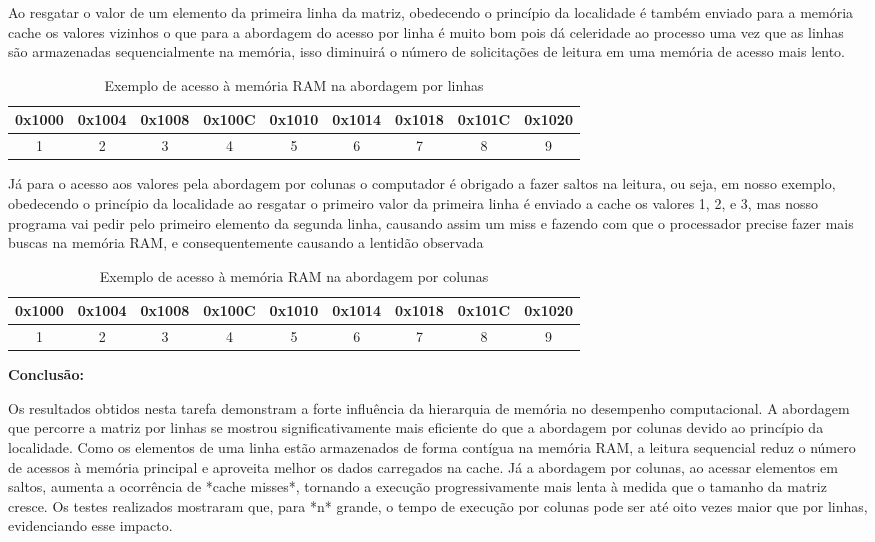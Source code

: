 \documentclass[a4paper, 12pt]{article}
\begin{document}
	Ao resgatar o valor de um elemento da primeira linha da matriz, obedecendo o princípio da localidade é também enviado para a memória cache os valores vizinhos o que para a abordagem do acesso por linha é muito bom pois dá celeridade ao processo uma vez que as linhas são armazenadas sequencialmente na memória, isso diminuirá o número de solicitações de leitura em uma memória de acesso mais lento.
	
	\begin{table}[ht]
	\centering
		\begin{tabular}{|c|c|c|c|c|c|c|c|c|}
			\hline
			0x1000 & 0x1004 & 0x1008 & 0x100C & 0x1010 & 0x1014 & 0x1018 & 0x101C & 0x1020 \\
			\hline
			\cellcolor{cyan}1      & \cellcolor{cyan}2      & \cellcolor{cyan}3      & 4      & 5      & 6      & 7      & 8      & 9      \\
			\hline
		\end{tabular}
		\caption{Exemplo de acesso à memória RAM na abordagem por linhas}
	\end{table}
	
	 Já para o acesso aos valores pela abordagem por colunas o computador é obrigado a fazer saltos na leitura, ou seja, em nosso exemplo, obedecendo o princípio da localidade ao resgatar o primeiro valor da primeira linha é enviado a cache os valores 1, 2, e 3, mas nosso programa vai pedir pelo primeiro elemento da segunda linha, causando assim um miss e fazendo com que o processador precise fazer mais buscas na memória RAM, e consequentemente causando a lentidão observada
	
	\begin{table}[ht]
	\centering
		\begin{tabular}{|c|c|c|c|c|c|c|c|c|}
			\hline
			0x1000 & 0x1004 & 0x1008 & 0x100C & 0x1010 & 0x1014 & 0x1018 & 0x101C & 0x1020 \\
			\hline
			\cellcolor{cyan}1      & 2      & 3      & \cellcolor{cyan}4      & 5      & 6      & \cellcolor{cyan}7      & 8      & 9      \\
			\hline
		\end{tabular}
	\caption{Exemplo de acesso à memória RAM na abordagem por colunas}
	\end{table}
	
	\vspace{0,5cm}
	
	\textbf{Conclusão:}
	
	Os resultados obtidos nesta tarefa demonstram a forte influência da hierarquia de memória no desempenho computacional. A abordagem que percorre a matriz por linhas se mostrou significativamente mais eficiente do que a abordagem por colunas devido ao princípio da localidade. Como os elementos de uma linha estão armazenados de forma contígua na memória RAM, a leitura sequencial reduz o número de acessos à memória principal e aproveita melhor os dados carregados na cache. Já a abordagem por colunas, ao acessar elementos em saltos, aumenta a ocorrência de *cache misses*, tornando a execução progressivamente mais lenta à medida que o tamanho da matriz cresce. Os testes realizados mostraram que, para *n* grande, o tempo de execução por colunas pode ser até oito vezes maior que por linhas, evidenciando esse impacto. 
	 
\end{document}
